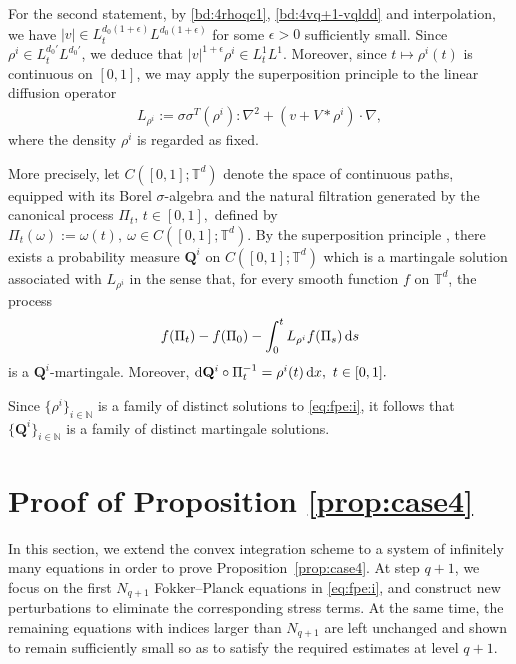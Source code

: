 \documentclass[UTF-8,reqno]{amsart}
\numberwithin{equation}{section}
\theoremstyle{definition}
\def\dif{{\mathord{{\rm d}}}}
\def\dif{{\mathord{{\rm d}}}}
\begin{document}
 For the second statement,
by \eqref{bd:4rhoqc1}, \eqref{bd:4vq+1-vqldd} and interpolation, we have $|v| \in L_{t}^{d_0(1+\epsilon)}L^{d_0(1+\epsilon)}$ for some $\epsilon > 0$ sufficiently small. Since $\rho^i \in L_{t}^{d_0'}L^{d_0'}$, we deduce that $|v|^{1+\epsilon} \rho^i \in L_{t}^{1}L^{1}$.
Moreover, since
$
t\mapsto \rho^i(t)
$
is continuous on $[0,1]$, we may apply the superposition principle to the linear diffusion operator
\begin{align*}
L_{\rho^i}
:=
 \sigma\sigma^T(\rho^i):\nabla^2 
+
(v+V*\rho^i)\cdot\nabla,
\end{align*}
where the density $\rho^i$ is regarded as fixed.

More precisely, let $C([0,1];\mathbb{T}^d)$ denote the space of continuous paths, equipped with its Borel $\sigma$-algebra and the natural filtration generated by the canonical process
$
\Pi_t$, $t\in[0,1],
$
defined by
$
\Pi_t(\omega):=\omega(t),\ 
\omega\in C([0,1];\mathbb{T}^d).
$
By the superposition principle \cite[Section~7.2]{Tre14}, there exists a probability measure $\mathbf{Q}^i$ on $C([0,1];\mathbb{T}^d)$ which is a martingale solution associated with $L_{\rho^i}$ in the sense that, for every smooth function $f$ on $\mathbb{T}^d$, the process
\begin{align*}
f(\Pi_t)
-
f(\Pi_0)
-
\int_0^t
L_{\rho^i}f(\Pi_s)\,\dif s
\end{align*}
is a $\mathbf{Q}^i$-martingale. Moreover,
$
\dif\mathbf{Q}^i\circ \Pi_t^{-1}
=
\rho^i(t)\,\dif x,
\ 
t\in[0,1].
$

Since $\{\rho^i\}_{i\in\mathbb{N}}$ is a family of distinct solutions to \eqref{eq:fpe:i}, it follows that $\{\mathbf{Q}^i\}_{i\in\mathbb{N}}$ is a family of distinct martingale solutions.
 


\section{Proof of Proposition \ref{prop:case4}}\label{sec:convex}
In this section, we extend the convex integration scheme to a system of infinitely many equations in order to prove Proposition~\ref{prop:case4}. 
At step $q+1$, we focus on the first $N_{q+1}$ Fokker--Planck equations in \eqref{eq:fpe:i}, and construct new perturbations to eliminate the corresponding stress terms. 
At the same time, the remaining equations with indices larger than $N_{q+1}$ are left unchanged and shown to remain sufficiently small so as to satisfy the required estimates at level $q+1$.
\end{document}
